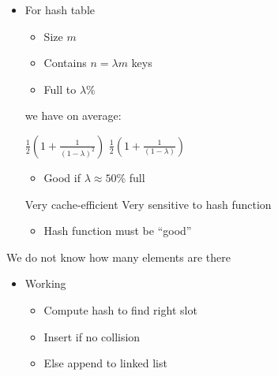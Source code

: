 \begin{itemize}
\begin{itemize}
\begin{itemize}
\begin{itemize}
                            \item For hash table
                                \begin{itemize}
                                    \item Size $m$
                                    \item Contains $n = \lambda m$ keys
                                    \item Full to $\lambda \%$
                                \end{itemize}
                                we have on average:
                                \begin{itemize}
                                     $\frac{1}{2} (1 + \frac{1}{(1 - \lambda)^2})$
                                 $\frac{1}{2} (1 + \frac{1}{(1 - \lambda)})$
                                        \begin{itemize}
                                            \item Good if $\lambda \approx 50\%$ full
                                        \end{itemize}
                                \end{itemize}
                            \ipro Very cache-efficient
                            \icon Very sensitive to hash function
                                \begin{itemize}
                                    \item Hash function must be ``good''
                                \end{itemize}
                        \end{itemize}
                \end{itemize}
             We do not know how many elements are there
                \begin{itemize}
                        \begin{itemize}
                            \item Working
                                \begin{itemize}
                                    \item Compute hash to find right slot
                                    \item Insert if no collision
                                    \item Else append to linked list

\end{itemize}
\end{itemize}
\end{itemize}
\end{itemize}
\end{itemize}
